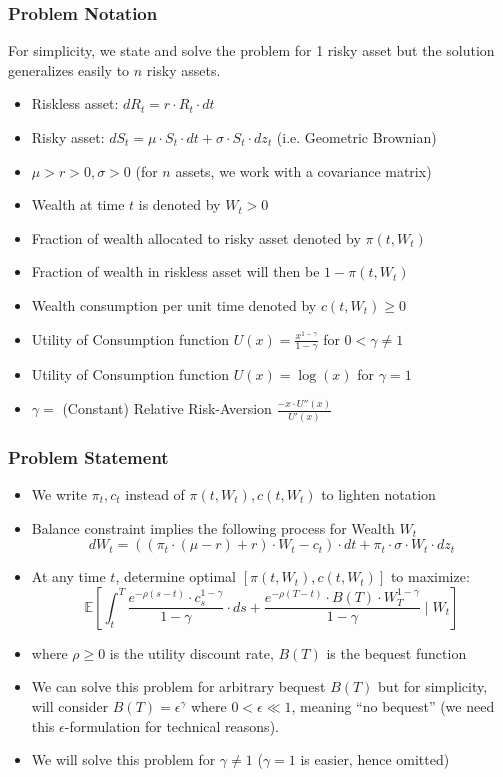 \documentclass[handout]{beamer}
\begin{document}
\begin{frame}
\frametitle{Problem Notation}
For simplicity, we state and solve the problem for 1 risky asset but the solution generalizes easily to $n$ risky assets.
\pause
\begin{itemize}[<+->]
\item Riskless asset: $dR_t = r \cdot R_t \cdot dt$
\item Risky asset: $dS_t = \mu \cdot S_t \cdot dt + \sigma \cdot S_t \cdot dz_t$ (i.e. Geometric Brownian)
\item $\mu > r > 0, \sigma > 0$ (for $n$ assets, we work with a covariance matrix)
\item Wealth at time $t$ is denoted by $W_t > 0$
\item Fraction of wealth allocated to risky asset denoted by $\pi(t, W_t)$
\item Fraction of wealth in riskless asset will then be $1 - \pi(t, W_t)$
\item Wealth consumption per unit time denoted by $c(t, W_t) \geq 0$
\item Utility of Consumption function $U(x) = \frac {x^{1-\gamma}} {1 - \gamma}$ for $0 < \gamma \neq 1$
\item Utility of Consumption function $U(x) = \log(x)$ for $\gamma = 1$
\item $\gamma =$ (Constant) Relative Risk-Aversion $\frac {-x \cdot U''(x)} {U'(x)}$
\end{itemize}
\end{frame}

\begin{frame}
\frametitle{Problem Statement}
\pause
\begin{itemize}[<+->]
\item We write $\pi_t, c_t$ instead of $\pi(t, W_t), c(t, W_t)$ to lighten notation
\item Balance constraint implies the following process for Wealth $W_t$
$$dW_t = ((\pi_t \cdot (\mu - r) + r) \cdot W_t - c_t) \cdot dt + \pi_t \cdot \sigma \cdot W_t \cdot dz_t$$
\item At any time $t$, determine optimal $[\pi(t,W_t), c(t, W_t)]$ to maximize:
$$\mathbb{E}[\int_t^T \frac {e^{-\rho (s-t)} \cdot c_s^{1-\gamma}} {1-\gamma} \cdot ds + \frac {e^{-\rho (T-t)} \cdot B(T) \cdot W_T^{1-\gamma}} {1-\gamma} \mid W_t]$$
\item where $\rho \geq 0$ is the utility discount rate, $B(T)$ is the bequest function
\item We can solve this problem for arbitrary bequest $B(T)$ but for simplicity, will consider $B(T) = \epsilon^{\gamma}$
where $0 < \epsilon \ll 1$, meaning ``no bequest'' (we need this $\epsilon$-formulation for technical reasons).
\item We will solve this problem for $\gamma \neq 1$ ($\gamma = 1$ is easier, hence omitted)
\end{itemize}
\end{frame}
\end{document}
